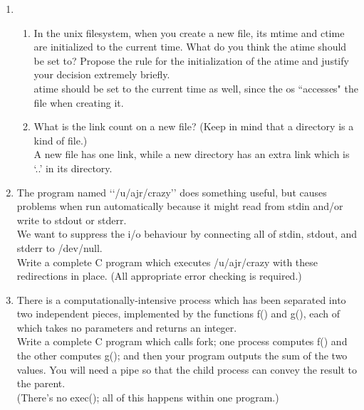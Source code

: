 \documentclass[11pt]{article}
\begin{document}
\begin{enumerate}
	\newpage
	\item \begin{enumerate}
		\item In the unix filesystem, when you create a new file, its mtime and ctime are initialized to the current time. What do you think the atime should be set to? Propose the rule for the initialization of the atime and justify your decision extremely briefly.\\
		\hspace*{1cm} atime should be set to the current time as well, since the os ``accesses" the file when creating it.
		
		\item What is the link count on a new file? (Keep in mind that a directory is a kind of file.)\\
		\hspace*{1cm} A new file has one link, while a new directory has an extra link which is `..' in its directory.
	\end{enumerate}
	\vspace{1in}
	\item The program named ‘‘/u/ajr/crazy’’ does something useful, but causes problems when run automatically because it might read from stdin and/or write to stdout or stderr.\\
	\hspace*{1cm}We want to suppress the i/o behaviour by connecting all of stdin, stdout, and stderr to /dev/null.\\
	\hspace*{1cm}Write a complete C program which executes /u/ajr/crazy with these redirections in place. (All appropriate error checking is required.)
		
		
	\newpage
	\item There is a computationally-intensive process which has been separated into two independent pieces, implemented by the functions f() and g(), each of which takes no parameters and returns an integer.\\
	\hspace*{1cm} Write a complete C program which calls fork; one process computes f() and the other computes g(); and then your program outputs the sum of the two values. You will need a pipe so that the child process can convey the result to the parent.\\
	\hspace{1cm} (There’s no exec(); all of this happens within one program.)
		


\end{enumerate}
\end{document}
